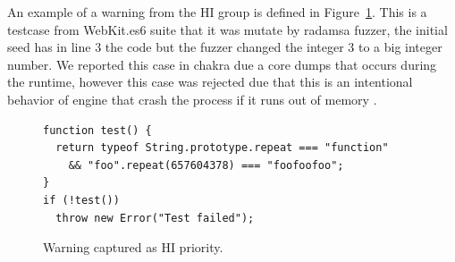 \documentclass[10pt,conference,anonymous]{IEEEtran}
\begin{document}
An example of a warning from the HI group is defined in Figure~\ref{fig:hi-priority}. 
This is a testcase from WebKit.es6 suite that it was mutate by radamsa fuzzer, the 
initial seed has in line 3 the code  but the fuzzer changed the 
integer 3 to a big integer number. We reported this case in chakra due a core dumps that occurs
during the runtime, however this case was rejected due  that
this is an intentional behavior of engine that crash the process if it runs out of memory
\cite{bug4979}.

\begin{figure}[h!]
  \centering
  \scriptsize
  \begin{lstlisting}
function test() {
  return typeof String.prototype.repeat === "function"
    && "foo".repeat(657604378) === "foofoofoo";
}
if (!test())
  throw new Error("Test failed");
  \end{lstlisting}
  \normalsize
  \caption{Warning captured as HI priority.}
  \label{fig:hi-priority}
  \end{figure}
\end{document}
